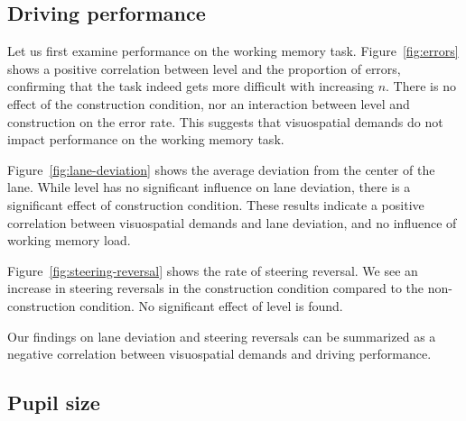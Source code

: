 \subsection{Driving performance}
Let us first examine performance on the working memory task.
Figure~\ref{fig:errors} shows a positive correlation between \nback level and the proportion of errors,
confirming that the \nback task indeed gets more difficult with increasing \(n\). 
There is no effect of the construction condition, nor an interaction between \nback level and construction on the error rate.
This suggests that visuospatial demands do not impact performance on the working memory task.

Figure~\ref{fig:lane-deviation} shows the average deviation from the center of the lane.
While \nback level has no significant influence on lane deviation, there is a significant effect of construction condition.
These results indicate a positive correlation between visuospatial demands and lane deviation, and no influence of working memory load.

Figure~\ref{fig:steering-reversal} shows the rate of steering reversal.
We see an increase in steering reversals in the construction condition compared to the non-construction condition.
No significant effect of \nback level is found.

Our findings on lane deviation and steering reversals can be summarized as a negative correlation between visuospatial demands and driving performance.

\subsection{Pupil size}

